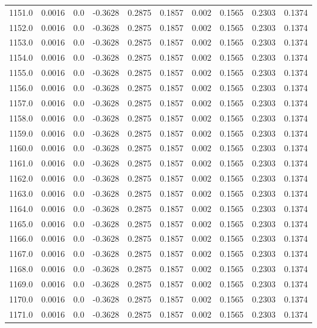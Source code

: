 \begin{longtable}{lrrrrrrrrr}
1151.0 & 0.0016 & 0.0 & -0.3628 & 0.2875 & 0.1857 & 0.002 & 0.1565 & 0.2303 & 0.1374 \\
1152.0 & 0.0016 & 0.0 & -0.3628 & 0.2875 & 0.1857 & 0.002 & 0.1565 & 0.2303 & 0.1374 \\
1153.0 & 0.0016 & 0.0 & -0.3628 & 0.2875 & 0.1857 & 0.002 & 0.1565 & 0.2303 & 0.1374 \\
1154.0 & 0.0016 & 0.0 & -0.3628 & 0.2875 & 0.1857 & 0.002 & 0.1565 & 0.2303 & 0.1374 \\
1155.0 & 0.0016 & 0.0 & -0.3628 & 0.2875 & 0.1857 & 0.002 & 0.1565 & 0.2303 & 0.1374 \\
1156.0 & 0.0016 & 0.0 & -0.3628 & 0.2875 & 0.1857 & 0.002 & 0.1565 & 0.2303 & 0.1374 \\
1157.0 & 0.0016 & 0.0 & -0.3628 & 0.2875 & 0.1857 & 0.002 & 0.1565 & 0.2303 & 0.1374 \\
1158.0 & 0.0016 & 0.0 & -0.3628 & 0.2875 & 0.1857 & 0.002 & 0.1565 & 0.2303 & 0.1374 \\
1159.0 & 0.0016 & 0.0 & -0.3628 & 0.2875 & 0.1857 & 0.002 & 0.1565 & 0.2303 & 0.1374 \\
1160.0 & 0.0016 & 0.0 & -0.3628 & 0.2875 & 0.1857 & 0.002 & 0.1565 & 0.2303 & 0.1374 \\
1161.0 & 0.0016 & 0.0 & -0.3628 & 0.2875 & 0.1857 & 0.002 & 0.1565 & 0.2303 & 0.1374 \\
1162.0 & 0.0016 & 0.0 & -0.3628 & 0.2875 & 0.1857 & 0.002 & 0.1565 & 0.2303 & 0.1374 \\
1163.0 & 0.0016 & 0.0 & -0.3628 & 0.2875 & 0.1857 & 0.002 & 0.1565 & 0.2303 & 0.1374 \\
1164.0 & 0.0016 & 0.0 & -0.3628 & 0.2875 & 0.1857 & 0.002 & 0.1565 & 0.2303 & 0.1374 \\
1165.0 & 0.0016 & 0.0 & -0.3628 & 0.2875 & 0.1857 & 0.002 & 0.1565 & 0.2303 & 0.1374 \\
1166.0 & 0.0016 & 0.0 & -0.3628 & 0.2875 & 0.1857 & 0.002 & 0.1565 & 0.2303 & 0.1374 \\
1167.0 & 0.0016 & 0.0 & -0.3628 & 0.2875 & 0.1857 & 0.002 & 0.1565 & 0.2303 & 0.1374 \\
1168.0 & 0.0016 & 0.0 & -0.3628 & 0.2875 & 0.1857 & 0.002 & 0.1565 & 0.2303 & 0.1374 \\
1169.0 & 0.0016 & 0.0 & -0.3628 & 0.2875 & 0.1857 & 0.002 & 0.1565 & 0.2303 & 0.1374 \\
1170.0 & 0.0016 & 0.0 & -0.3628 & 0.2875 & 0.1857 & 0.002 & 0.1565 & 0.2303 & 0.1374 \\
1171.0 & 0.0016 & 0.0 & -0.3628 & 0.2875 & 0.1857 & 0.002 & 0.1565 & 0.2303 & 0.1374 \\

\end{longtable}
